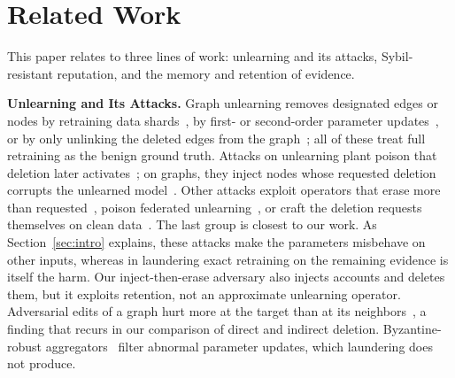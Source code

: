 \documentclass[lettersize,journal]{IEEEtran}
\begin{document}
\section{Related Work}
\label{sec:related}

This paper relates to three lines of work: unlearning and its attacks, Sybil-resistant reputation, and the memory and retention of evidence.

\smallskip\noindent\textbf{Unlearning and Its Attacks.}
Graph unlearning removes designated edges or nodes by retraining data shards~\cite{chen2022graph}, by first- or second-order parameter updates~\cite{wu2023gif,kurmanji2024towards}, or by only unlinking the deleted edges from the graph~\cite{tan2024unlink}; all of these treat full retraining as the benign ground truth.
Attacks on unlearning plant poison that deletion later activates~\cite{di2023hidden}; on graphs, they inject nodes whose requested deletion corrupts the unlearned model~\cite{zhang2026attack}. Other attacks exploit operators that erase more than requested~\cite{hu2024duty}, poison federated unlearning~\cite{unlearnguard2025}, or craft the deletion requests themselves on clean data~\cite{zhao2023static,qian2023towards}.
The last group is closest to our work. As Section~\ref{sec:intro} explains, these attacks make the parameters misbehave on other inputs, whereas in laundering exact retraining on the remaining evidence is itself the harm.
Our inject-then-erase adversary also injects accounts and deletes them, but it exploits retention, not an approximate unlearning operator.
Adversarial edits of a graph hurt more at the target than at its neighbors~\cite{zugner2018adversarial}, a finding that recurs in our comparison of direct and indirect deletion.
Byzantine-robust aggregators~\cite{blanchard2017machine,yin2018byzantine} filter abnormal parameter updates, which laundering does not produce.
\end{document}
